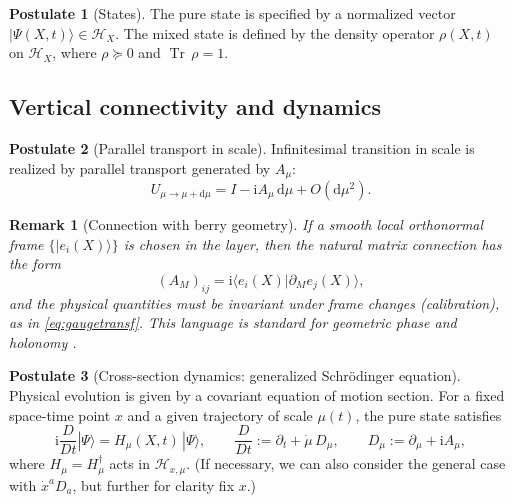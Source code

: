 \documentclass[11pt,a4paper]{article}
\DeclareMathOperator{\Tr}{Tr}
\newcommand{\ii}{\mathrm{i}}
\newcommand{\dd}{\mathrm{d}}
\theoremstyle{definition}
\newtheorem{axiom}{Postulate}[section]
\theoremstyle{plain}
\newtheorem{remark}{Remark}[section]
\theoremstyle{remark}
\begin{document}
\begin{axiom}[States]\label{ax:states}
The pure state is specified by a normalized vector $|\Psi(X,t)\rangle\in\mathcal H_{X}$.
The mixed state is defined by the density operator $\rho(X,t)$ on $\mathcal H_{X}$, where $\rho\succeq 0$ and $\Tr\,\rho=1$.
\end{axiom}

\subsection{Vertical connectivity and dynamics}
\label{sec:axioms:dynamics}

\begin{axiom}[Parallel transport in scale]\label{ax:verticaltransport}
Infinitesimal transition in scale is realized by parallel transport generated by $A_\mu$:
\begin{equation}\label{eq:Uinf}
U_{\mu\to\mu+\dd\mu} = I - \ii A_\mu\,\dd\mu + O(\dd\mu^2).
\end{equation}
\end{axiom}

\begin{remark}[Connection with berry geometry]\label{rem:berry}
If a smooth local orthonormal frame $\{|e_i(X)\rangle\}$ is chosen in the layer, then the natural matrix connection has the form
\begin{equation}\label{eq:berryA}
(A_M)_{ij} = \ii\langle e_i(X)|\partial_M e_j(X)\rangle,
\end{equation}
and the physical quantities must be invariant under frame changes (calibration), as in \eqref{eq:gaugetransf}.
This language is standard for geometric phase and holonomy \cite{Berry1984QuantalPhase,Simon1983HolonomyBerry}.
\end{remark}

\begin{axiom}[Cross-section dynamics: generalized Schrödinger equation]\label{ax:genSchr}
Physical evolution is given by a covariant equation of motion section.
For a fixed space-time point $x$ and a given trajectory of scale $\mu(t)$, the pure state satisfies
\begin{equation}\label{eq:genSchr}
\ii\frac{D}{Dt}|\Psi\rangle = H_\mu(X,t)\,|\Psi\rangle,
\qquad
\frac{D}{Dt} := \partial_t + \dot{\mu}\,D_\mu,
\qquad
D_\mu := \partial_\mu + \ii A_\mu,
\end{equation}
where $H_\mu=H_\mu^\dagger$ acts in $\mathcal H_{x,\mu}$.
(If necessary, we can also consider the general case with $\dot x^a D_a$, but further for clarity fix $x$.)
\end{axiom}
\end{document}
